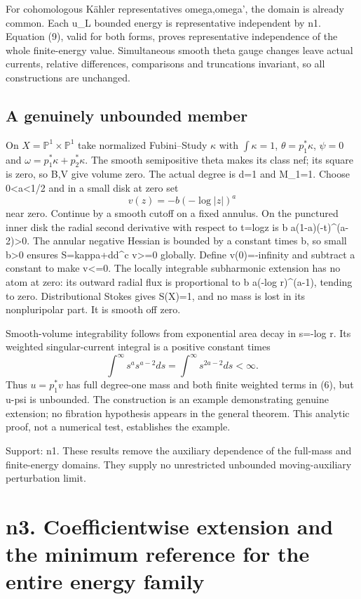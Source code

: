 \documentclass[
]{article}
\begin{document}
For cohomologous Kähler representatives omega,omega', the domain is
already common. Each u\_L bounded energy is representative independent
by n1. Equation (9), valid for both forms, proves representative
independence of the whole finite-energy value. Simultaneous smooth theta
gauge changes leave actual currents, relative differences, comparisons
and truncations invariant, so all constructions are unchanged.

\subsection{A genuinely unbounded
member}\label{a-genuinely-unbounded-member}

On \(X=\mathbb P^1\times\mathbb P^1\) take normalized Fubini--Study
\(\kappa\) with \(\int\kappa=1\), \(\theta=p_1^*\kappa\), \(\psi=0\) and
\(\omega=p_1^*\kappa+p_2^*\kappa\). The smooth semipositive theta makes
its class nef; its square is zero, so B,V give volume zero. The actual
degree is d=1 and M\_1=1. Choose 0\textless a\textless1/2 and in a small
disk at zero set \[
v(z)=-b(-\log|z|)^a
\] near zero. Continue by a smooth cutoff on a fixed annulus. On the
punctured inner disk the radial second derivative with respect to
t=log\textbar z\textbar{} is b a(1-a)(-t)\^{}(a-2)\textgreater0. The
annular negative Hessian is bounded by a constant times b, so small
b\textgreater0 ensures S=kappa+dd\^{}c v\textgreater=0 globally. Define
v(0)=-infinity and subtract a constant to make v\textless=0. The locally
integrable subharmonic extension has no atom at zero: its outward radial
flux is proportional to b a(-log r)\^{}(a-1), tending to zero.
Distributional Stokes gives S(X)=1, and no mass is lost in its
nonpluripolar part. It is smooth off zero.

Smooth-volume integrability follows from exponential area decay in
s=-log r. Its weighted singular-current integral is a positive constant
times \[
\int^\infty s^a s^{a-2}ds=\int^\infty s^{2a-2}ds<\infty.
\] Thus \(u=p_1^*v\) has full degree-one mass and both finite weighted
terms in (6), but u-psi is unbounded. The construction is an example
demonstrating genuine extension; no fibration hypothesis appears in the
general theorem. This analytic proof, not a numerical test, establishes
the example.

Support: n1. These results remove the auxiliary dependence of the
full-mass and finite-energy domains. They supply no unrestricted
unbounded moving-auxiliary perturbation limit.

\section{n3. Coefficientwise extension and the minimum reference for the
entire energy
family}\label{n3.-coefficientwise-extension-and-the-minimum-reference-for-the-entire-energy-family}
\end{document}
